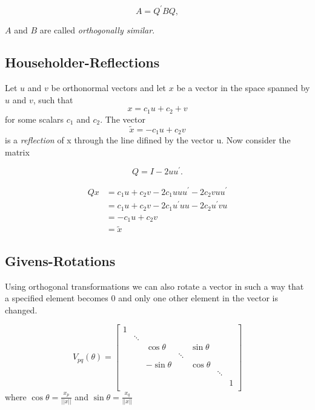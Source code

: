 \documentclass[12pt]{article}
\begin{document}
$$ A = Q^{\prime} B Q, $$

$A$ and $B$ are called \textit{orthogonally similar}.


\subsection{Householder-Reflections}

Let $u$ and $v$ be orthonormal vectors and let $x$ be a vector in the space spanned by $u$ and $v$, such that
$$x = c_1 u + c_2 + v$$ 
for some scalars $c_1$ and $c_2$. The vector 
$$\tilde{x}=-c_1 u + c_2 v$$ 
is a \textit{reflection} of x through the line difined by the vector u. Now consider the matrix

\begin{equation}
Q = I - 2 uu^{\prime}.
\end{equation}


\begin{align*}
Qx &= c_1 u + c_2 v - 2c_1 uuu^{\prime} - 2 c_2 v uu^{\prime} \\
   &= c_1 u + c_2 v - 2c_1 u^{\prime}uu - 2 c_2 u^{\prime} v u \\
   &= -c_1 u + c_2 v\\
   &= \tilde{x}
\end{align*}
\subsection{Givens-Rotations}

Using orthogonal transformations we can also rotate a vector in such a way that a specified element becomes 0 and only one other element in the vector is changed.

\begin{equation}
\label{givens-rotation}
V_{pq}(\theta) = \begin{bmatrix}
                      1 \\
                        & \ddots \\
                        &        & \cos\theta    &        & \sin\theta  \\
                        &        &               & \ddots     \\
                        &        & -\sin\theta   &        & \cos\theta   \\
                        &        &               &        &            &  \ddots \\
                        &        &               &        &            &         & 1 \\                      
                 \end{bmatrix}
\end{equation}
	where $\cos\theta = \frac{x_p}{||x||}$ and $\sin\theta = \frac{x_q}{||x||}$
\end{document}
